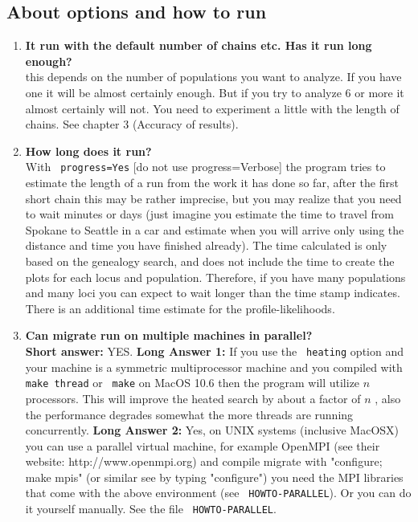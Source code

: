 \subsection{About options and how to run}
\begin{enumerate}
\item {\bfseries It run with the default number of chains etc. Has it run
long enough?}\\
this depends on the number of populations you want to analyze.
If you have one it will be almost certainly enough. But if you
try to analyze 6 or more it almost certainly will not. You need to experiment a little with the length of chains. See chapter 3 (Accuracy of results).
\item {\bfseries How long does it run?}\\
With \texttt{ progress=Yes} [do not use progress=Verbose] the program tries to estimate the length
of a run from the work it has done so far, after the first short chain
this may be rather imprecise, but you may realize that you need to
wait minutes or days (just imagine you estimate the time to travel
from Spokane to Seattle in a car and estimate when you will arrive
only using the distance and time you have finished already).
The time calculated is only based on the genealogy
search, and does not include the time to create the plots for each
locus and population. Therefore, if you have many populations and many loci
you can expect to wait longer than the time stamp indicates. There is
an additional time estimate for the profile-likelihoods.
\item {\bfseries Can migrate run on multiple machines in parallel?}\\
{\bfseries Short answer:} YES. {\bfseries Long Answer 1:} If you use the \texttt{ heating} option
and your machine is a symmetric multiprocessor machine and you 
compiled with \texttt{ make thread} or \texttt{ make} on MacOS 10.6 then the program will utilize $n$ 
processors. This will improve the heated search by about a factor of $n$
, also the performance degrades somewhat the more threads are running
concurrently.
{\bfseries Long Answer 2:} Yes, on UNIX systems (inclusive MacOSX) you can use a parallel virtual machine, for example OpenMPI (see their website: http://www.openmpi.org)
and compile migrate with "configure; make mpis" (or similar see by typing "configure") you need the MPI libraries that come with
the above environment (see \texttt{ HOWTO-PARALLEL}). Or you 
can do it yourself manually. See
the file \texttt{ HOWTO-PARALLEL}.
\end{enumerate}

